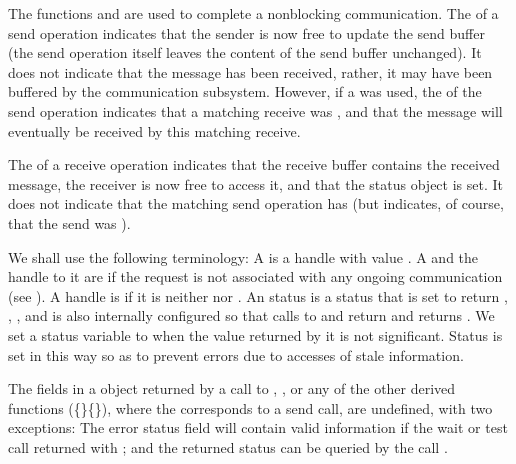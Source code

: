 The functions  and  are used to complete a
nonblocking communication.  The  of a send operation indicates that
the sender is now free
to update the send buffer
(the send operation itself leaves the content
of the send buffer unchanged). It does not indicate that the
message has been received,
rather, it may have been buffered by the communication
subsystem.  However, if a 
was used, the  of the
send operation indicates that a matching receive was , and that the
message will eventually be received by this matching receive.

The  of a receive operation indicates that the receive buffer
contains the received message, the receiver is now free to access it,
and that the status object is set.  It does
not indicate that the matching send operation has  (but indicates, of
course, that the send was ).

We shall use the following terminology:
A  is a handle with
value\flushline
{}.
A 
and the handle to it are 
if the request is not associated with any ongoing
communication (see ).
A handle is  if it is neither  nor .
An
 status is a status that is set to return
\mpicode{ = },
\mpicode{ = },
\mpicode{ = },
and is also internally configured so that calls to
 and  return
and  returns .
We set a status variable to  when the value returned by it is not
significant. Status is set in this
way so as to prevent errors due to accesses of stale information.

The fields in a  object returned by a call to
, , or any of the other derived functions
(\{\}\{\}),
where the  corresponds to a send call, are undefined, with two
exceptions: The error status field will contain valid information if the wait
or test call returned with ; and the returned
status can be queried by the call .

